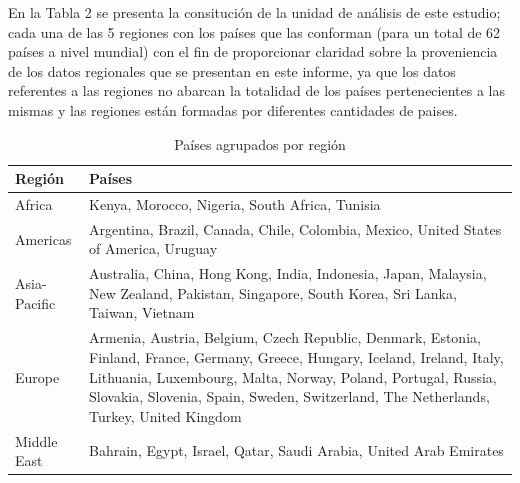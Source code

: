 \documentclass[
]{article}
\begin{document}
\begin{multicols}{2}

En la Tabla 2 se presenta la consitución de la unidad de análisis de este estudio; cada una de las 5 regiones con los países que las conforman (para un total de 62 países a nivel mundial) con el fin de proporcionar claridad sobre la proveniencia de los datos regionales que se presentan en este informe, ya que los datos referentes a las regiones no abarcan la totalidad de los países pertenecientes a las mismas y las regiones están formadas por diferentes cantidades de paises.

\end{multicols}

\renewcommand{\arraystretch}{1.5}
\begin{footnotesize}
\begin{longtable}[t]{lp{12cm}}
\caption{\label{tab:tabla2}Países agrupados por región}\\
\toprule
Región & Países\\
\midrule
Africa & Kenya, Morocco, Nigeria, South Africa, Tunisia\\
Americas & Argentina, Brazil, Canada, Chile, Colombia, Mexico, United States of America, Uruguay\\
Asia-Pacific & Australia, China, Hong Kong, India, Indonesia, Japan, Malaysia, New Zealand, Pakistan, Singapore, South Korea, Sri Lanka, Taiwan, Vietnam\\
Europe & Armenia, Austria, Belgium, Czech Republic, Denmark, Estonia, Finland, France, Germany, Greece, Hungary, Iceland, Ireland, Italy, Lithuania, Luxembourg, Malta, Norway, Poland, Portugal, Russia, Slovakia, Slovenia, Spain, Sweden, Switzerland, The Netherlands, Turkey, United Kingdom\\
Middle East & Bahrain, Egypt, Israel, Qatar, Saudi Arabia, United Arab Emirates\\
\bottomrule
\end{longtable}

\end{footnotesize}\renewcommand{\arraystretch}{1}
\end{document}
